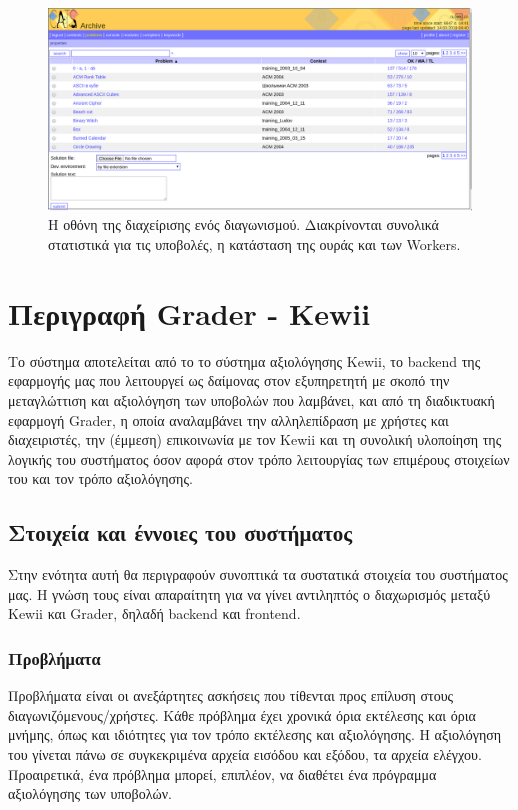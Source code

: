 \documentclass[diploma]{softlab-thesis}
\begin{document}
\begin{figure}
  \centering
  \includegraphics[scale=0.3,trim=4 4 4 4,clip]{Figures/catssubmission.png}
  \caption[Οθόνη διαχείρισης προβλήματος]{Η οθόνη της διαχείρισης ενός διαγωνισμού.
  Διακρίνονται συνολικά στατιστικά για τις υποβολές, η κατάσταση της ουράς και των
  Workers.}
\end{figure}

\FloatBarrier

\chapter{Περιγραφή Grader - Kewii}

Το σύστημα αποτελείται από το το σύστημα αξιολόγησης Kewii, το backend της
εφαρμογής μας που λειτουργεί ως δαίμονας στον εξυπηρετητή με σκοπό την
μεταγλώττιση και αξιολόγηση των υποβολών που λαμβάνει, και από τη διαδικτυακή
εφαρμογή Grader, η οποία αναλαμβάνει την αλληλεπίδραση με χρήστες και
διαχειριστές, την (έμμεση) επικοινωνία με τον Kewii και τη συνολική υλοποίηση
της λογικής του συστήματος όσον αφορά στον τρόπο λειτουργίας των επιμέρους
στοιχείων του και τον τρόπο αξιολόγησης.

\section{Στοιχεία και έννοιες του συστήματος}

Στην ενότητα αυτή θα περιγραφούν συνοπτικά τα συστατικά στοιχεία του συστήματος
μας. Η γνώση τους είναι απαραίτητη για να γίνει αντιληπτός ο διαχωρισμός μεταξύ
Kewii και Grader, δηλαδή backend και frontend.

\subsection{Προβλήματα}

Προβλήματα είναι οι ανεξάρτητες ασκήσεις που τίθενται προς επίλυση στους
διαγωνιζόμενους/χρήστες. Κάθε πρόβλημα έχει χρονικά όρια εκτέλεσης και όρια
μνήμης, όπως και ιδιότητες για τον τρόπο εκτέλεσης και αξιολόγησης. Η
αξιολόγηση του γίνεται πάνω σε συγκεκριμένα αρχεία εισόδου και εξόδου, τα
αρχεία ελέγχου. Προαιρετικά, ένα πρόβλημα μπορεί, επιπλέον, να διαθέτει ένα
πρόγραμμα αξιολόγησης των υποβολών.
\end{document}
